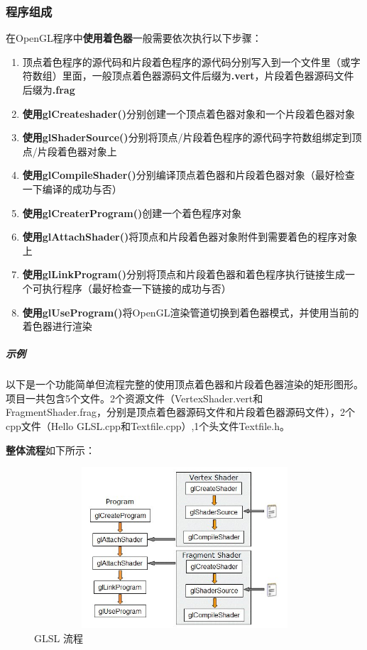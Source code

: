 \documentclass[UTF8,a4paper,8pt]{ctexart}
\begin{document}
		\subsubsection{程序组成}
			在OpenGL程序中\textbf{使用着色器}一般需要依次执行以下步骤：
				\begin{enumerate}[itemindent = 1em]
					\item 顶点着色程序的源代码和片段着色程序的源代码分别写入到一个文件里（或字符数组）里面，一般顶点着色器源码文件后缀为\textbf{.vert}，片段着色器源码文件后缀为\textbf{.frag}
					\item \textbf{使用glCreateshader()}分别创建一个顶点着色器对象和一个片段着色器对象
					\item \textbf{使用glShaderSource()}分别将顶点/片段着色程序的源代码字符数组绑定到顶点/片段着色器对象上
					\item \textbf{使用glCompileShader()}分别编译顶点着色器和片段着色器对象（最好检查一下编译的成功与否）
					\item \textbf{使用glCreaterProgram()}创建一个着色程序对象
					\item \textbf{使用glAttachShader()}将顶点和片段着色器对象附件到需要着色的程序对象上
					\item \textbf{使用glLinkProgram()}分别将顶点和片段着色器和着色程序执行链接生成一个可执行程序（最好检查一下链接的成功与否）
					\item \textbf{使用glUseProgram()}将OpenGL渲染管道切换到着色器模式，并使用当前的着色器进行渲染
				\end{enumerate}	
				\subparagraph{示例}
					以下是一个功能简单但流程完整的使用顶点着色器和片段着色器渲染的矩形图形。项目一共包含5个文件。2个资源文件（VertexShader.vert和FragmentShader.frag，分别是顶点着色器源码文件和片段着色器源码文件），2个cpp文件（Hello GLSL.cpp和Textfile.cpp）,1个头文件Textfile.h。
					
					\textbf{整体流程}如下所示：
						\begin{figure}[h]
							\centering
							\includegraphics[width = 12cm, height = 6cm]{GLSLProcess.png}
							\caption{GLSL 流程}
							\label{GLSL}
						\end{figure}
					
\end{document}
